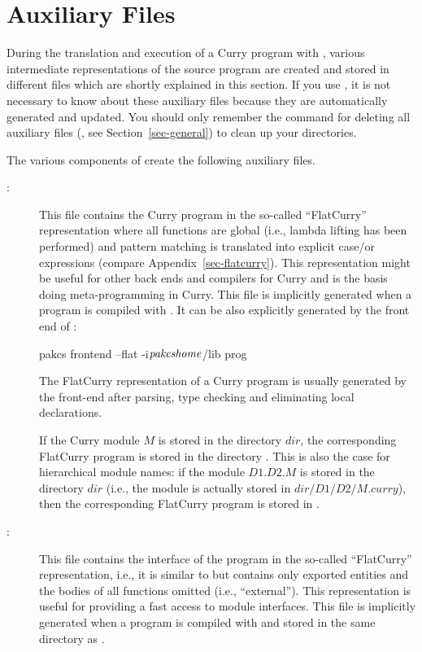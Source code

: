 \section{Auxiliary Files}
\label{sec-auxfiles}

During the translation and execution of a Curry program with \CYS,
various intermediate representations of the source program are created
and stored in different files which are shortly explained in this section.
If you use \CYS, it is not necessary to know about
these auxiliary files because they are automatically generated
and updated. You should only remember the command for deleting
all auxiliary files (, see Section~\ref{sec-general})
to clean up your directories.

The various components of \CYS create the following auxiliary files.
\begin{description}
\item[:] This file contains the Curry program
in the so-called ``FlatCurry'' representation where all functions are global
(i.e., lambda lifting has been performed) and pattern matching
is translated into explicit case/or expressions
(compare Appendix~\ref{sec-flatcurry}).
This representation might be useful for other back ends and
compilers for Curry and is the basis doing meta-programming in Curry.
This file is implicitly
generated when a program is compiled with \CYS.
It can be also explicitly generated by the
front end of \CYS:
\begin{curry}
pakcs frontend --flat -i$\mbox{\textit{pakcshome}}$/lib prog
\end{curry}
The FlatCurry representation of a Curry program is usually
generated by the front-end after parsing, type checking and eliminating
local declarations.

If the Curry module $M$ is stored in the directory $dir$,
the corresponding FlatCurry program is stored in the directory
.
This is also the case for hierarchical module names:
if the module $D1.D2.M$ is stored in the directory $dir$
(i.e., the module is actually stored in $dir/D1/D2/M.curry$),
then the corresponding FlatCurry program is stored in
.

\item[:] This file contains the interface
of the program in the so-called ``FlatCurry'' representation,
i.e., it is similar to  but contains only exported
entities and the bodies of all functions omitted (i.e., ``external'').
This representation is useful for providing a fast access
to module interfaces.
This file is implicitly generated when a program is compiled with \CYS
and stored in the same directory as .


\end{description}

